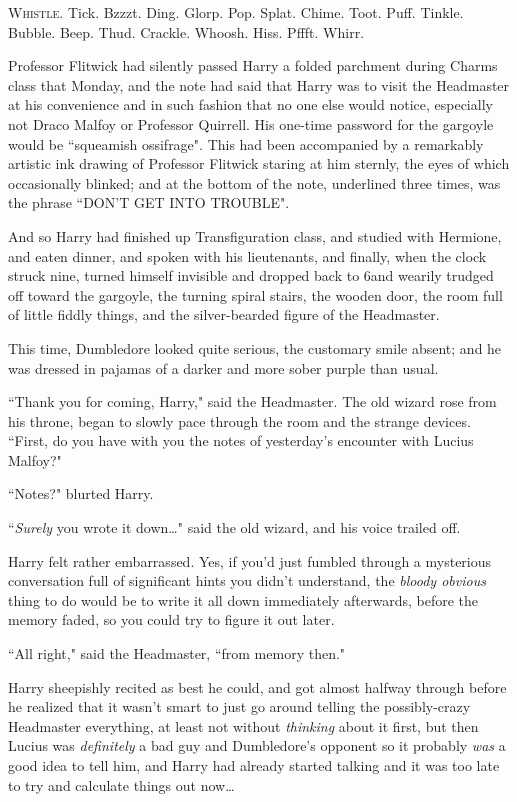 
\lettrine{W}{histle.} Tick. Bzzzt. Ding. Glorp. Pop. Splat. Chime. Toot. Puff. Tinkle. Bubble. Beep. Thud. Crackle. Whoosh. Hiss. Pffft. Whirr.

Professor Flitwick had silently passed Harry a folded parchment during Charms class that Monday, and the note had said that Harry was to visit the Headmaster at his convenience and in such fashion that no one else would notice, especially not Draco Malfoy or Professor Quirrell. His one-time password for the gargoyle would be ``squeamish ossifrage". This had been accompanied by a remarkably artistic ink drawing of Professor Flitwick staring at him sternly, the eyes of which occasionally blinked; and at the bottom of the note, underlined three times, was the phrase ``DON'T GET INTO TROUBLE".

And so Harry had finished up Transfiguration class, and studied with Hermione, and eaten dinner, and spoken with his lieutenants, and finally, when the clock struck nine, turned himself invisible and dropped back to 6\pm and wearily trudged off toward the gargoyle, the turning spiral stairs, the wooden door, the room full of little fiddly things, and the silver-bearded figure of the Headmaster.

This time, Dumbledore looked quite serious, the customary smile absent; and he was dressed in pajamas of a darker and more sober purple than usual.

``Thank you for coming, Harry," said the Headmaster. The old wizard rose from his throne, began to slowly pace through the room and the strange devices. ``First, do you have with you the notes of yesterday's encounter with Lucius Malfoy?"

``Notes?" blurted Harry.

``\emph{Surely} you wrote it down{\ldots}" said the old wizard, and his voice trailed off.

Harry felt rather embarrassed. Yes, if you'd just fumbled through a mysterious conversation full of significant hints you didn't understand, the \emph{bloody obvious} thing to do would be to write it all down immediately afterwards, before the memory faded, so you could try to figure it out later.

``All right," said the Headmaster, ``from memory then."

Harry sheepishly recited as best he could, and got almost halfway through before he realized that it wasn't smart to just go around telling the possibly-crazy Headmaster everything, at least not without \emph{thinking} about it first, but then Lucius was \emph{definitely} a bad guy and Dumbledore's opponent so it probably \emph{was} a good idea to tell him, and Harry had already started talking and it was too late to try and calculate things out now{\ldots}

